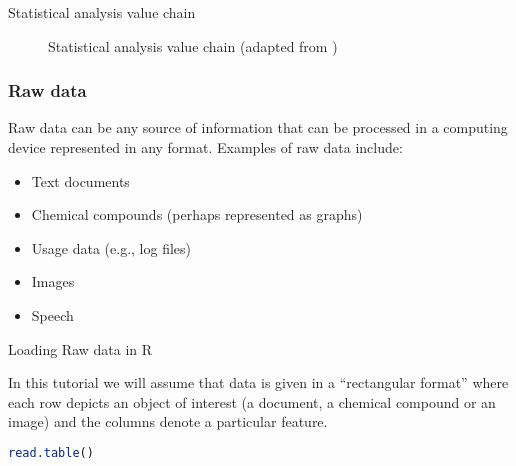 \documentclass[]{beamer}
\begin{document}
  \begin{frame}{Statistical analysis value chain}
    \begin{center}
      \begin{figure}
        \centering
        \caption{Statistical analysis value chain (adapted from \cite{})}
      \end{figure}
    \end{center}
  \end{frame}


  \begin{frame}
    \frametitle{Raw data}
    
    Raw data can be any source of information that can be processed in
    a computing device represented in any format. Examples of raw data include:
    
    \begin{itemize}
    \item Text documents
    \item Chemical compounds (perhaps represented as graphs)
    \item Usage data (e.g., log files)
    \item Images
    \item Speech
    \end{itemize}
  \end{frame}

  \begin{frame}[containsverbatim]{Loading Raw data in R}

    In this tutorial we will assume that data is given in a
    ``rectangular format'' where each row depicts an object of
    interest (a document, a chemical compound or an image) and the
    columns denote a particular feature.
    
    
    \begin{lstlisting}[language=R]
      read.table()
    \end{lstlisting}
  \end{frame}
\end{document}
